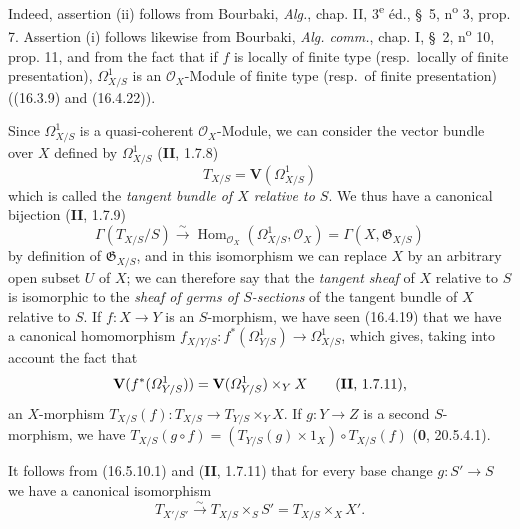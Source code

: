 Indeed, assertion (ii) follows from Bourbaki, \emph{Alg.}, chap. II,
3\textsuperscript{e} éd., \S~5, n\textsuperscript{o} 3, prop. 7. Assertion
(i) follows likewise from Bourbaki, \emph{Alg. comm.}, chap. I, \S~2,
n\textsuperscript{o} 10, prop. 11, and from the fact that if $f$ is locally of
finite type (resp.\ locally of finite presentation), $\varOmega_{X/S}^1$ is an
$\mathcal{O}_X$-Module of finite type (resp.\ of finite presentation) ((16.3.9)
and (16.4.22)).

\begin{env}[16.5.12]\label{IV.16.5.12}
Since $\varOmega_{X/S}^1$ is a quasi-coherent $\mathcal{O}_X$-Module, we can
consider the vector bundle over $X$ defined by $\varOmega_{X/S}^1$
(\textbf{II}, 1.7.8)
\[
  T_{X/S}=\mathbf{V}(\varOmega_{X/S}^1)
  \tag{16.5.12.1}
  \label{IV.16.5.12.1}
\]
which is called the \emph{tangent bundle of $X$ relative to $S$}. We thus have a
canonical bijection (\textbf{II}, 1.7.9)
\[
  \Gamma(T_{X/S}/S)\xrightarrow{\sim}
  \operatorname{Hom}_{\mathcal{O}_X}(\varOmega_{X/S}^1,\mathcal{O}_X)
  =\Gamma(X,\mathfrak{G}_{X/S})
\]
by definition of $\mathfrak{G}_{X/S}$, and in this isomorphism we can
replace $X$ by an arbitrary open subset $U$ of $X$; we can therefore say that the
\emph{tangent sheaf} of $X$ relative to $S$ is isomorphic to the
\emph{sheaf of germs of $S$-sections} of the tangent bundle of $X$
relative to $S$. If $f:X\to Y$ is an $S$-morphism, we have seen (16.4.19)
that we have a canonical homomorphism
$f_{X/Y/S}:f^*(\varOmega_{Y/S}^1)\to\varOmega_{X/S}^1$, which gives, taking into
account the fact that
\[
  \mathbf{V}(f^*(\varOmega_{Y/S}^1))
  =\mathbf{V}(\varOmega_{Y/S}^1)\times_Y X\qquad\text{(\textbf{II}, 1.7.11),}
\]
an $X$-morphism
$T_{X/S}(f):T_{X/S}\to T_{Y/S}\times_Y X$. If $g:Y\to Z$ is a second
$S$-morphism, we have
$T_{X/S}(g\circ f)=(T_{Y/S}(g)\times1_X)\circ T_{X/S}(f)$ (\textbf{0}, 20.5.4.1).

It follows from (16.5.10.1) and (\textbf{II}, 1.7.11) that for every base change
$g:S'\to S$ we have a canonical isomorphism
\[
  T_{X'/S'}\xrightarrow{\sim}T_{X/S}\times_S S'
  =T_{X/S}\times_X X'.
  \tag{16.5.12.2}
  \label{IV.16.5.12.2}
\]
\end{env}

